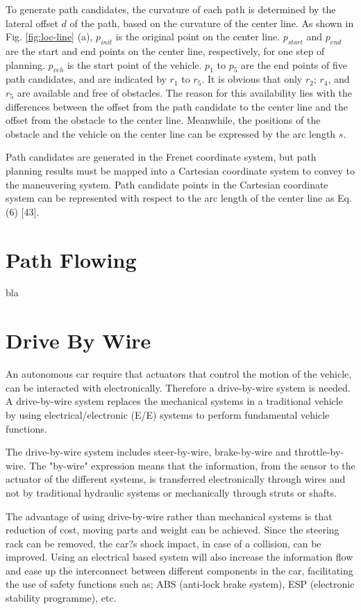 To generate path candidates, the curvature of each path is determined by the lateral offset $d$ of the path, based on the curvature of the center line. As shown in Fig. \ref{fig:loc-line} (a), $p_{init}$ is the original point on the center line. $p_{start}$ and $p_{end}$ are the start and end points on the center line, respectively, for one step of planning. $p_{veh}$ is the start point of the vehicle. $p_1$ to $p_5$ are the end points of five path candidates, and are indicated by $r_1$ to $r_5$. It is obvious that only $r_2$; $r_4$, and $r_5$ are available and free of obstacles. The reason for this availability lies with the differences between the offset from the path candidate to the center line and the offset from the obstacle to the center line. Meanwhile, the positions of the obstacle and the vehicle on the center line can be expressed by the arc length $s$.

Path candidates are generated in the Frenet coordinate system, but path planning results must be mapped into a Cartesian coordinate system to convey to the maneuvering system. Path candidate points in the Cartesian coordinate system can be represented with respect to the arc length of the center line as Eq. (6) [43].

\section{Path Flowing}

bla

\section{Drive By Wire}

An autonomous car require that actuators that control the motion of the vehicle, can be interacted with electronically. Therefore a drive-by-wire system is needed. A drive-by-wire system replaces the mechanical systems in a traditional vehicle by using electrical/electronic (E/E) systems to perform fundamental vehicle functions.

The drive-by-wire system includes steer-by-wire, brake-by-wire and throttle-by-wire. The "by-wire" expression means that the information, from the sensor to the actuator of the different systems, is transferred electronically through wires and not by traditional hydraulic systems or mechanically through struts or shafts.

The advantage of using drive-by-wire rather than mechanical systems is that reduction of cost, moving parts and weight can be achieved. Since the steering rack can be removed, the car?s shock impact, in case of a collision, can be improved. Using an electrical based system will also increase the information flow and ease up the interconnect between different components in the car, facilitating the use of safety functions such as; ABS (anti-lock brake system), ESP (electronic stability programme), etc.


